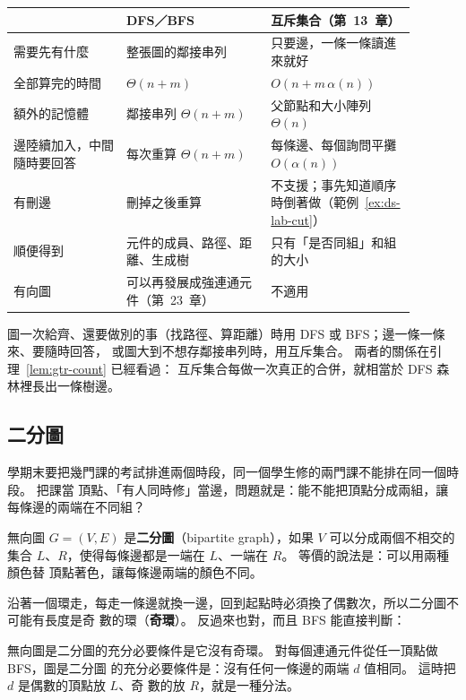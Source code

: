 \begin{center}
\small
\begin{tabular}{>{\raggedright\arraybackslash}p{0.25\linewidth}>{\raggedright\arraybackslash}p{0.32\linewidth}>{\raggedright\arraybackslash}p{0.32\linewidth}}
\toprule
 & DFS／BFS & 互斥集合（第~13~章） \\
\midrule
需要先有什麼 & 整張圖的鄰接串列 & 只要邊，一條一條讀進來就好 \\
全部算完的時間 & $\Theta(n + m)$ & $O(n + m\,\alpha(n))$ \\
額外的記憶體 & 鄰接串列 $\Theta(n + m)$ & 父節點和大小陣列 $\Theta(n)$ \\
邊陸續加入，中間隨時要回答 & 每次重算 $\Theta(n + m)$ & 每條邊、每個詢問平攤 $O(\alpha(n))$ \\
有刪邊 & 刪掉之後重算 & 不支援；事先知道順序時倒著做（範例~\ref{ex:ds-lab-cut}）\\
順便得到 & 元件的成員、路徑、距離、生成樹 & 只有「是否同組」和組的大小 \\
有向圖 & 可以再發展成強連通元件（第~23~章）& 不適用 \\
\bottomrule
\end{tabular}
\end{center}

圖一次給齊、還要做別的事（找路徑、算距離）時用 DFS 或 BFS；邊一條一條來、要隨時回答，
或圖大到不想存鄰接串列時，用互斥集合。 兩者的關係在引理~\ref{lem:gtr-count} 已經看過：
互斥集合每做一次真正的合併，就相當於 DFS 森林裡長出一條樹邊。

\subsection{二分圖}

學期末要把幾門課的考試排進兩個時段，同一個學生修的兩門課不能排在同一個時段。 把課當
頂點、「有人同時修」當邊，問題就是：能不能把頂點分成兩組，讓每條邊的兩端在不同組？

\begin{definition}[二分圖]
\label{def:gtr-bipartite}
無向圖 $G = (V, E)$ 是\textbf{二分圖}（bipartite graph），如果 $V$ 可以分成兩個不相交的
集合 $L$、$R$，使得每條邊都是一端在 $L$、一端在 $R$。 等價的說法是：可以用兩種顏色替
頂點著色，讓每條邊兩端的顏色不同。
\end{definition}

沿著一個環走，每走一條邊就換一邊，回到起點時必須換了偶數次，所以二分圖不可能有長度是奇
數的環（\textbf{奇環}）。 反過來也對，而且 BFS 能直接判斷：

\begin{theorem}
\label{thm:gtr-bipartite}
無向圖是二分圖的充分必要條件是它沒有奇環。 對每個連通元件從任一頂點做 BFS，圖是二分圖
的充分必要條件是：沒有任何一條邊的兩端 $d$ 值相同。 這時把 $d$ 是偶數的頂點放 $L$、奇
數的放 $R$，就是一種分法。
\end{theorem}

